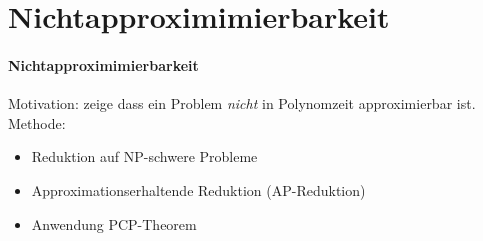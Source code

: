 \section{Nichtapproximimierbarkeit}

\paragraph{Nichtapproximimierbarkeit}
Motivation: zeige dass ein Problem \emph{nicht} in Polynomzeit approximierbar ist.
Methode:
\begin{itemize}
    \item Reduktion auf NP-schwere Probleme
    \item Approximationserhaltende Reduktion (AP-Reduktion)
    \item Anwendung PCP-Theorem
\end{itemize}
